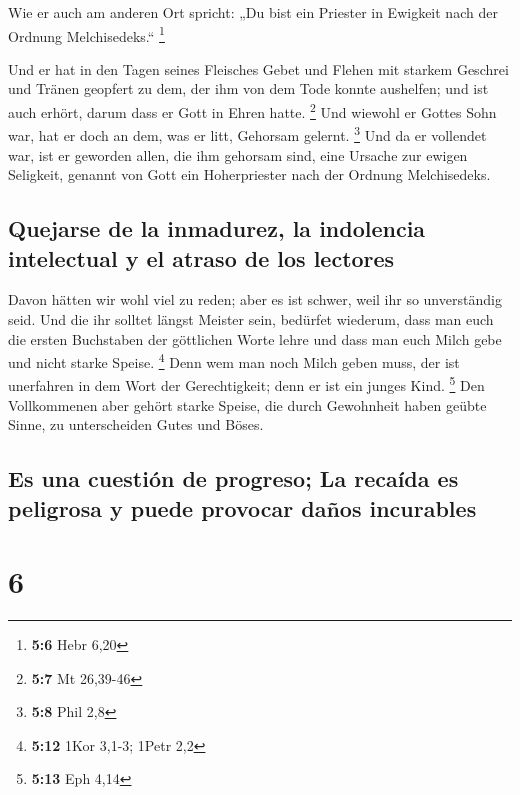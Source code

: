  Wie er auch am anderen Ort spricht: „Du bist ein Priester
in Ewigkeit nach der Ordnung Melchisedeks.`` \footnote{\textbf{5:6} Hebr
  6,20}

 Und er hat in den Tagen seines Fleisches Gebet und Flehen
mit starkem Geschrei und Tränen geopfert zu dem, der ihm von dem Tode
konnte aushelfen; und ist auch erhört, darum dass er Gott in Ehren
hatte. \footnote{\textbf{5:7} Mt 26,39-46}  Und wiewohl er
Gottes Sohn war, hat er doch an dem, was er litt, Gehorsam gelernt.
\footnote{\textbf{5:8} Phil 2,8}  Und da er vollendet war,
ist er geworden allen, die ihm gehorsam sind, eine Ursache zur ewigen
Seligkeit,  genannt von Gott ein Hoherpriester nach der
Ordnung Melchisedeks.

\hypertarget{quejarse-de-la-inmadurez-la-indolencia-intelectual-y-el-atraso-de-los-lectores}{%
\subsection{Quejarse de la inmadurez, la indolencia intelectual y el
atraso de los
lectores}\label{quejarse-de-la-inmadurez-la-indolencia-intelectual-y-el-atraso-de-los-lectores}}

 Davon hätten wir wohl viel zu reden; aber es ist schwer,
weil ihr so unverständig seid.  Und die ihr solltet
längst Meister sein, bedürfet wiederum, dass man euch die ersten
Buchstaben der göttlichen Worte lehre und dass man euch Milch gebe und
nicht starke Speise. \footnote{\textbf{5:12} 1Kor 3,1-3; 1Petr 2,2}
 Denn wem man noch Milch geben muss, der ist unerfahren
in dem Wort der Gerechtigkeit; denn er ist ein junges Kind. \footnote{\textbf{5:13}
  Eph 4,14}  Den Vollkommenen aber gehört starke Speise,
die durch Gewohnheit haben geübte Sinne, zu unterscheiden Gutes und
Böses.

\hypertarget{es-una-cuestiuxf3n-de-progreso-la-recauxedda-es-peligrosa-y-puede-provocar-dauxf1os-incurables}{%
\subsection{Es una cuestión de progreso; La recaída es peligrosa y puede
provocar daños
incurables}\label{es-una-cuestiuxf3n-de-progreso-la-recauxedda-es-peligrosa-y-puede-provocar-dauxf1os-incurables}}

\hypertarget{section-5}{%
\section{6}\label{section-5}}

